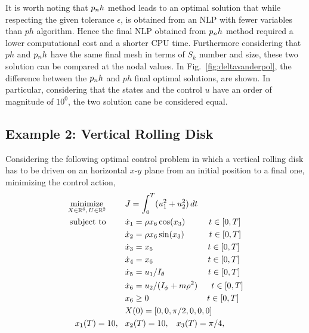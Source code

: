 It is worth noting that $p_{n}h$ method leads to an optimal solution that while respecting the given tolerance $\epsilon$, is obtained from an NLP with fewer variables than $ph$ algorithm.
Hence the final NLP obtained from $p_{n}h$ method required a lower computational cost and a shorter CPU time.
Furthermore considering that $ph$ and $p_{n}h$ have the same final mesh in terms of $S_k$ number and size, these two solution can be compared at the nodal values.
In Fig.~\ref{fig:deltavanderpol}, the difference between the $p_{n}h$ and $ph$ final optimal solutions, are shown.
In particular, considering that the states and the control $u$ have an order of magnitude of $10^{0}$, the two solution cane be considered equal.  
\subsection*{Example 2: Vertical Rolling Disk}
Considering the following optimal control problem in which a vertical rolling disk has to be driven on an horizontal $x$-$y$ plane from an initial position to a final one, minimizing the control action,
\begin{subequations}\label{eq:disk}
	\begin{align}
	\underset{X \in \mathbb{R}^{6}, \, U \in \mathbb{R}^{2}}{\text{minimize}}\hspace{8mm}
	&J = \int_{0}^{T}(u_{1}^{2} +  u_{2}^{2})\,dt  \label{eq:diskcost}\\
	\text{subject to} \hspace{8mm}
	& \dot{x}_1 = \rho x_6  \cos(x_3) \hspace{10mm} t \in[0,T] \label{eq:diskdyn1}\\
	& \dot{x}_2 = \rho x_6  \sin(x_3)\hspace{10.5mm} t \in[0,T] \label{eq:diskdyn2}\\
	& \dot{x}_3 = x_5\hspace{23mm} t \in[0,T] \label{eq:diskdyn3}\\
	& \dot{x}_4 = x_6\hspace{23mm} t \in[0,T] \label{eq:diskdyn4}\\
	& \dot{x}_5 = u_1/I_{\theta}\hspace{18.2mm} t \in[0,T] \label{eq:diskdyn5}\\
	& \dot{x}_6 = u_2/(I_{\phi} + m \rho^{2})\hspace{5.8mm} t \in[0,T] \label{eq:diskdyn6}\\
	& x_6 \geq 0  \hspace{24.5mm} t \in[0,T]\\
	&X(0) = [0, 0, \pi/2, 0, 0, 0]\\	
	 x_1(T) = 10,\hspace{3mm} &x_2(T) = 10, \hspace{3mm} x_3(T) = \pi/4, \label{eq:diskfinal1}		
	\end{align}
\end{subequations}
